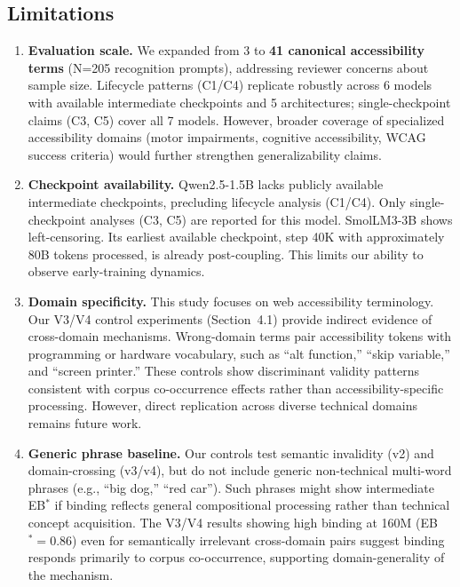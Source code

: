 \documentclass[10pt]{article} %
\begin{document}
\subsection{Limitations}

\begin{enumerate}
  \item \textbf{Evaluation scale.} We expanded from 3 to \textbf{41 canonical accessibility terms} (N=205 recognition prompts), addressing reviewer concerns about sample size. Lifecycle patterns (C1/C4) replicate robustly across 6 models with available intermediate checkpoints and 5 architectures; single-checkpoint claims (C3, C5) cover all 7 models. However, broader coverage of specialized accessibility domains (motor impairments, cognitive accessibility, WCAG success criteria) would further strengthen generalizability claims.

  \item \textbf{Checkpoint availability.} Qwen2.5-1.5B lacks publicly available intermediate checkpoints, precluding lifecycle analysis (C1/C4). Only single-checkpoint analyses (C3, C5) are reported for this model. SmolLM3-3B shows left-censoring. Its earliest available checkpoint, step 40K with approximately 80B tokens processed, is already post-coupling. This limits our ability to observe early-training dynamics.

  \item \textbf{Domain specificity.} This study focuses on web accessibility terminology. Our V3/V4 control experiments (Section~4.1) provide indirect evidence of cross-domain mechanisms. Wrong-domain terms pair accessibility tokens with programming or hardware vocabulary, such as ``alt function,'' ``skip variable,'' and ``screen printer.'' These controls show discriminant validity patterns consistent with corpus co-occurrence effects rather than accessibility-specific processing. However, direct replication across diverse technical domains remains future work.

  \item \textbf{Generic phrase baseline.} Our controls test semantic invalidity (v2) and domain-crossing (v3/v4), but do not include generic non-technical multi-word phrases (e.g., ``big dog,'' ``red car''). Such phrases might show intermediate EB$^*$ if binding reflects general compositional processing rather than technical concept acquisition. The V3/V4 results showing high binding at 160M (EB$^*=0.86$) even for semantically irrelevant cross-domain pairs suggest binding responds primarily to corpus co-occurrence, supporting domain-generality of the mechanism.


\end{enumerate}
\end{document}
